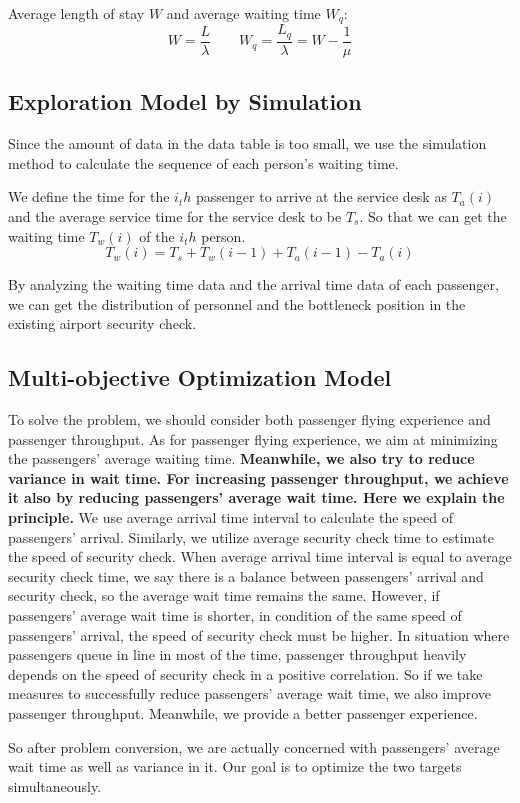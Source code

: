 \documentclass{mcmthesis}
\begin{document}
Average length of stay $W$ and average waiting time $W_q$: 
\begin{equation}
	W = \frac{L}{\lambda} \qquad W_q = \frac{L_q}{\lambda} = W - \frac{1}{\mu}
\end{equation}



\subsection{Exploration Model by Simulation}
\par Since the amount of data in the data table is too small, we use the simulation method to calculate the sequence of each person's waiting time. 
\par We define the time for the $i_th$ passenger to arrive at the service desk as $T_a(i)$ and the average service time for the service desk to be $T_s$. So that we can get the waiting time $T_w(i)$ of the $i_th$ person.
\begin{equation}
	T_w(i) = T_s + T_w(i-1) + T_a(i-1) - T_a(i)
\end{equation}
\par By analyzing the waiting time data and the arrival time data of each passenger, we can get the distribution of personnel and the bottleneck position in the existing airport security check.

\subsection{Multi-objective Optimization Model}

\par To solve the problem, we should consider both passenger flying experience and passenger throughput. As for passenger flying experience, we aim at minimizing the passengers' average waiting time. \textbf{Meanwhile, we also try to reduce variance in wait time. For increasing passenger throughput, we achieve it also by reducing passengers' average wait time. Here we explain the principle.} We use average arrival time interval to calculate the speed of passengers' arrival. Similarly, we utilize average security check time to estimate the speed of security check. When average arrival time interval is equal to average security check time, we say there is a balance between passengers' arrival and security check, so the average wait time remains the same. However, if passengers' average wait time is shorter, in condition of the same speed of passengers' arrival, the speed of security check must be higher. In situation where passengers queue in line in most of the time, passenger throughput heavily depends on the speed of security check in a positive correlation. So if we take measures to successfully reduce passengers' average wait time, we also improve passenger throughput. Meanwhile, we provide a better passenger experience. 
\par So after problem conversion, we are actually concerned with passengers' average wait time as well as variance in it. Our goal is to optimize the two targets simultaneously.
\end{document}

